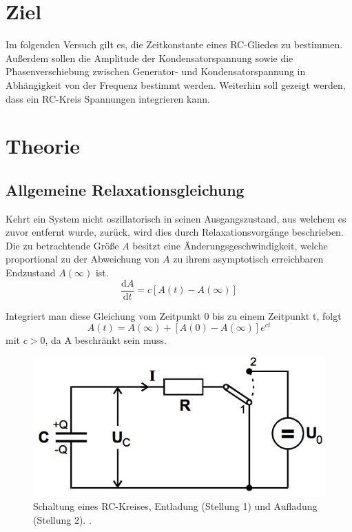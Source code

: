 \section{Ziel}
\label{sec:Ziel}
Im folgenden Versuch gilt es, die Zeitkonstante eines RC-Gliedes zu bestimmen. Außerdem sollen die Amplitude der Kondensatorspannung sowie die Phasenverschiebung zwischen Generator- und Kondensatorspannung in Abhängigkeit von der Frequenz bestimmt werden. Weiterhin soll gezeigt werden, dass ein RC-Kreis Spannungen integrieren kann.

\section{Theorie}
\label{sec:Theorie}
\subsection{Allgemeine Relaxationsgleichung}
Kehrt ein System nicht oszillatorisch in seinen Ausgangszustand, aus welchem es zuvor entfernt wurde, zurück, wird dies durch Relaxationsvorgänge beschrieben. Die zu betrachtende Größe $A$ besitzt eine Änderungsgeschwindigkeit, welche proportional zu der Abweichung von $A$ zu ihrem asymptotisch erreichbaren Endzustand $A(\infty)$ ist.
\begin{equation}
\label{eqn:dgl}
  \frac{\mathrm{d}A}{\mathrm{d}t} = c[A(t)-A(\infty)]
\end{equation}

Integriert man diese Gleichung vom Zeitpunkt 0 bis zu einem Zeitpunkt t, folgt
\begin{equation}
  A(t) = A(\infty) + [A(0) - A(\infty)]e^{ct}
\end{equation}
mit $c > 0$, da A beschränkt sein muss.

\begin{figure}
  \centering
  \includegraphics[scale=0.5]{content/RC-Kreis.jpg}
  \caption{Schaltung eines RC-Kreises, Entladung (Stellung 1) und Aufladung (Stellung 2). \cite{anleitung353}.}
  \label{fig:rc-kreis}
\end{figure}

